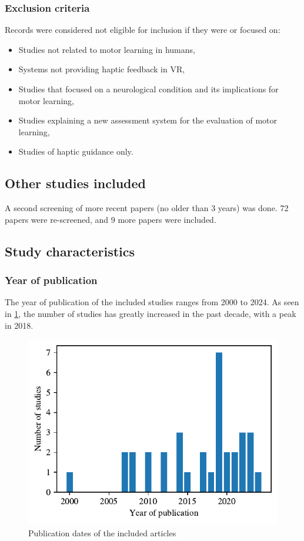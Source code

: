 \subsubsection{Exclusion criteria}
\label{sec:exclusion}
Records were considered not eligible for inclusion if they were or focused on:
\begin{itemize}
    \item Studies not related to motor learning in humans,
    \item Systems not providing haptic feedback in VR,
    \item Studies that focused on a neurological condition and its implications for motor learning,
    \item Studies explaining a new assessment system for the evaluation of motor learning,
    \item Studies of haptic guidance only.
\end{itemize}

\subsection{Other studies included}
A second screening of more recent papers (no older than 3 years) was done. 72 papers were re-screened, and 9 more papers were included.

\subsection{Study characteristics}

\subsubsection{Year of publication}
The year of publication of the included studies ranges from 2000 to 2024. As seen in \ref{fig:years}, the number of studies has greatly increased in the past decade, with a peak in 2018.

\begin{figure}[H]
    \centering
    \includegraphics[width=\columnwidth]{figures/years.pdf} 
    \caption{Publication dates of the included articles}
    \label{fig:years}
\end{figure} 


